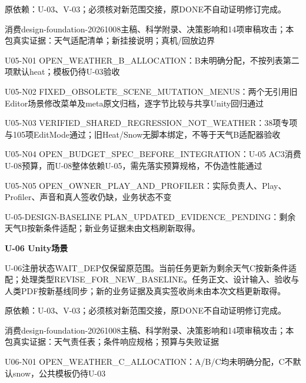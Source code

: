 \documentclass[11pt,a4paper]{article}
\newcommand{\reviewsection}[1]{\par\Needspace{5\baselineskip}\vspace{10pt}\begin{center}{\titlelatin\titlecjk\bfseries\fontsize{14}{20}\selectfont #1}\end{center}}
\begin{document}
原依赖：U-\allowbreak{}03、V-\allowbreak{}03；必须核对新范围交接，原DONE不自动证明修订完成。


消费design-\allowbreak{}foundation-\allowbreak{}20261008主稿、科学附录、决策影响和14项审稿攻击；本包真实证据：天气适配清单；新挂接说明；真机/\allowbreak{}回放边界


U05-\allowbreak{}N01 OPEN\_\allowbreak{}WEATHER\_\allowbreak{}B\_\allowbreak{}ALLOCATION：B未明确分配，不按列表第二项默认heat；模板仍待U-\allowbreak{}03验收


U05-\allowbreak{}N02 FIXED\_\allowbreak{}OBSOLETE\_\allowbreak{}SCENE\_\allowbreak{}MUTATION\_\allowbreak{}MENUS：两个无引用旧Editor场景修改菜单及meta原文归档，逐字节比较与共享Unity回归通过


U05-\allowbreak{}N03 VERIFIED\_\allowbreak{}SHARED\_\allowbreak{}REGRESSION\_\allowbreak{}NOT\_\allowbreak{}WEATHER：38项专项与105项EditMode通过；旧Heat/\allowbreak{}Snow无脚本绑定，不等于天气B适配器验收


U05-\allowbreak{}N04 OPEN\_\allowbreak{}BUDGET\_\allowbreak{}SPEC\_\allowbreak{}BEFORE\_\allowbreak{}INTEGRATION：U-\allowbreak{}05 AC3消费U-\allowbreak{}08预算，而U-\allowbreak{}08整体依赖U-\allowbreak{}05，需先落实预算规格，不伪造性能通过


U05-\allowbreak{}N05 OPEN\_\allowbreak{}OWNER\_\allowbreak{}PLAY\_\allowbreak{}AND\_\allowbreak{}PROFILER：实际负责人、Play、Profiler、声音和真人签收仍缺，业务状态不变


U-\allowbreak{}05-\allowbreak{}DESIGN-\allowbreak{}BASELINE PLAN\_\allowbreak{}UPDATED\_\allowbreak{}EVIDENCE\_\allowbreak{}PENDING：剩余天气B按新条件适配；新业务证据未由文档刷新取得。


\reviewsection{U-\allowbreak{}06 Unity场景}
U-\allowbreak{}06注册状态WAIT\_\allowbreak{}DEP仅保留原范围。当前任务更新为剩余天气C按新条件适配；处理类型REVISE\_\allowbreak{}FOR\_\allowbreak{}NEW\_\allowbreak{}BASELINE。任务正文、设计输入、验收与人类PDF按新基线同步；新的业务证据及真实签收尚未由本次文档更新取得。


原依赖：U-\allowbreak{}03、V-\allowbreak{}03；必须核对新范围交接，原DONE不自动证明修订完成。


消费design-\allowbreak{}foundation-\allowbreak{}20261008主稿、科学附录、决策影响和14项审稿攻击；本包真实证据：天气责任表；条件响应规格；预算与失败证据


U06-\allowbreak{}N01 OPEN\_\allowbreak{}WEATHER\_\allowbreak{}C\_\allowbreak{}ALLOCATION：A/\allowbreak{}B/\allowbreak{}C均未明确分配，C不默认snow，公共模板仍待U-\allowbreak{}03
\end{document}
